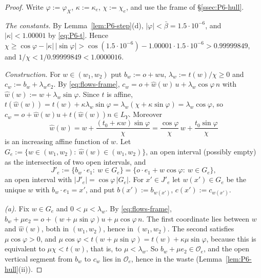 \documentclass[11pt]{amsart}
\newcommand{\bbar}{\bar\beta}
\theoremstyle{definition}
\theoremstyle{remark}
\numberwithin{equation}{section}
\begin{document}
\begin{proof}
Write $\varphi:=\varphi_X$, $\kappa:=\kappa_e$, $\chi:=\chi_e$, and use the frame of \S\ref{ssec:P6-hull}.

\emph{The constants.} By Lemma~\ref{lem:P6-step}(d), $|\varphi|<\bbar=1.5\cdot10^{-6}$, and $|\kappa|<1.00001$ by
\eqref{eq:P6-t}. Hence
$\chi\ge\cos\varphi-|\kappa|\,|\sin\varphi|>\cos(1.5\cdot10^{-6})-1.00001\cdot1.5\cdot10^{-6}>0.99999849$, and
$1/\chi<1/0.99999849<1.0000016$.

\emph{Construction.} For $w\in(w_1,w_2)$ put $b_w:=o+wu$, $\lambda_w:=t(w)/\chi\ge0$ and $c_w:=b_w+\lambda_w e_2$.
By \eqref{eq:flows-frame}, $c_w=o+\hat w(w)\,u+\lambda_w\cos\varphi\,n$ with $\hat w(w):=w+\lambda_w\sin\varphi$. Since
$t$ is affine, $t(\hat w(w))=t(w)+\kappa\lambda_w\sin\varphi=\lambda_w(\chi+\kappa\sin\varphi)=\lambda_w\cos\varphi$, so
$c_w=o+\hat w(w)u+t(\hat w(w))n\in L_Y$. Moreover
\[
\hat w(w)=w+\frac{(t_0+\kappa w)\sin\varphi}{\chi}=\frac{\cos\varphi}{\chi}\,w+\frac{t_0\sin\varphi}{\chi}
\]
is an increasing affine function of $w$. Let $G_e:=\{w\in(w_1,w_2):\ \hat w(w)\in(w_1,w_2)\}$, an open interval
(possibly empty) as the intersection of two open intervals, and
\[
J'_e:=\{b_w\cdot e_1:\ w\in G_e\}=\{o\cdot e_1+w\cos\varphi:\ w\in G_e\},
\]
an open interval with $|J'_e|=\cos\varphi\,|G_e|$. For $x'\in J'_e$ let $w(x')\in G_e$ be the unique $w$ with
$b_w\cdot e_1=x'$, and put $b(x'):=b_{w(x')}$, $c(x'):=c_{w(x')}$.

\emph{(a).} Fix $w\in G_e$ and $0<\mu<\lambda_w$. By \eqref{eq:flows-frame},
$b_w+\mu e_2=o+(w+\mu\sin\varphi)u+\mu\cos\varphi\,n$. The first coordinate lies between $w$ and $\hat w(w)$, both
in $(w_1,w_2)$, hence in $(w_1,w_2)$. The second satisfies $\mu\cos\varphi>0$, and
$\mu\cos\varphi<t(w+\mu\sin\varphi)=t(w)+\kappa\mu\sin\varphi$, because this is equivalent to $\mu\chi<t(w)$, that is,
to $\mu<\lambda_w$. So $b_w+\mu e_2\in\mathcal O_e$, and the open vertical segment from $b_w$ to $c_w$ lies in
$\mathcal O_e$, hence in the waste (Lemma~\ref{lem:P6-hull}(ii)).


\end{proof}
\end{document}
